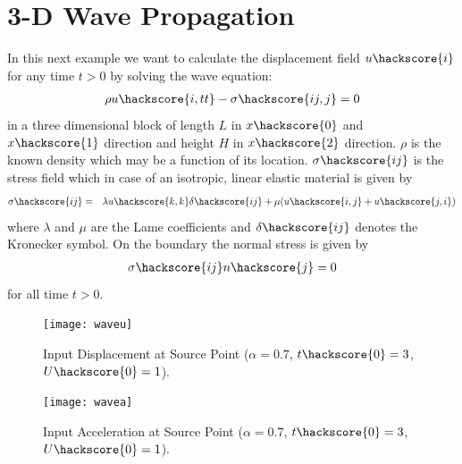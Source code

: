 
%
%
%


\section{3-D Wave Propagation}
\label{WAVE CHAP}

In this next example we want to calculate the displacement field $u\hackscore{i}$ for any time $t>0$ by solving the wave equation:
\begin{eqnarray}\label{WAVE general problem}
\rho u\hackscore{i,tt} - \sigma\hackscore{ij,j}=0
\end{eqnarray}
in a three dimensional block of length $L$ in $x\hackscore{0}$
and $x\hackscore{1}$ direction and height $H$
in $x\hackscore{2}$ direction. $\rho$ is the known density which may be a function of its location.
$\sigma\hackscore{ij}$ is the stress field  which in case of an isotropic, linear elastic material is given by
\begin{eqnarray} \label{WAVE stress}
\sigma\hackscore{ij} & = & \lambda u\hackscore{k,k} \delta\hackscore{ij} + \mu ( u\hackscore{i,j} + u\hackscore{j,i})
\end{eqnarray}
where $\lambda$ and $\mu$ are the Lame coefficients 
 and $\delta\hackscore{ij}$ denotes the Kronecker symbol.
On the boundary the normal stress is given by
\begin{eqnarray} \label{WAVE natural}
\sigma\hackscore{ij}n\hackscore{j}=0
\end{eqnarray}
for all time $t>0$.

\begin{figure}[t!]
\centerline{\texttt{[image: waveu]}}
\caption{Input Displacement at Source Point ($\alpha=0.7$, $t\hackscore{0}=3$, $U\hackscore{0}=1$).}
\label{WAVE FIG 1.2}
\end{figure}

\begin{figure}[t!]
\centerline{\texttt{[image: wavea]}}
\caption{Input Acceleration at Source Point ($\alpha=0.7$, $t\hackscore{0}=3$, $U\hackscore{0}=1$).}
\label{WAVE FIG 1.1}
\end{figure}

